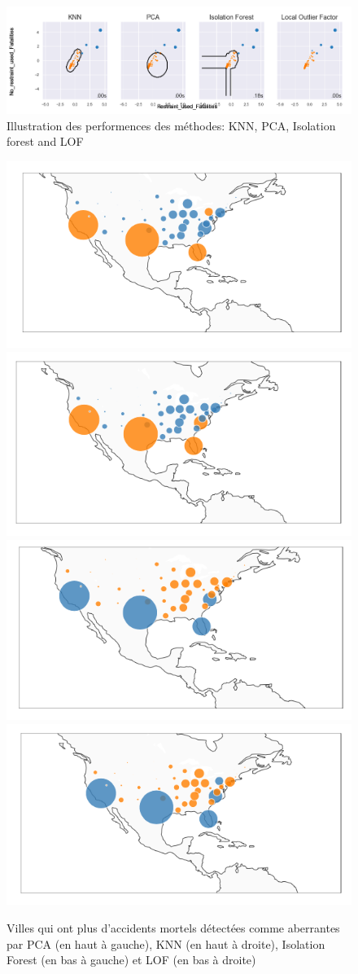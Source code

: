  \begin{figure}[ht]
    \centering
    \includegraphics[width=1\textwidth]{ADOA/Images/Fatal11.png}
    \caption{Illustration des performences des méthodes: KNN, PCA, Isolation forest and LOF}%
    \label{fig3}
\end{figure}
\vspace{2cm}

\begin{figure}[ht]
    \centering
    \includegraphics[width=.45\textwidth]{ADOA/Images/FatPCA.png}
    \includegraphics[width=.450\textwidth]{ADOA/Images/FatKNN.png}\\
    \includegraphics[width=.45\textwidth]{ADOA/Images/FatIsofore.png}
    \includegraphics[width=.450\textwidth]{ADOA/Images/FatLOF.png}
    \caption{Villes qui ont plus d'accidents mortels détectées comme aberrantes par PCA (en haut à gauche), KNN (en haut à droite), Isolation Forest (en bas à gauche) et LOF (en bas à droite)}%
    \label{fig2b}
\end{figure}

